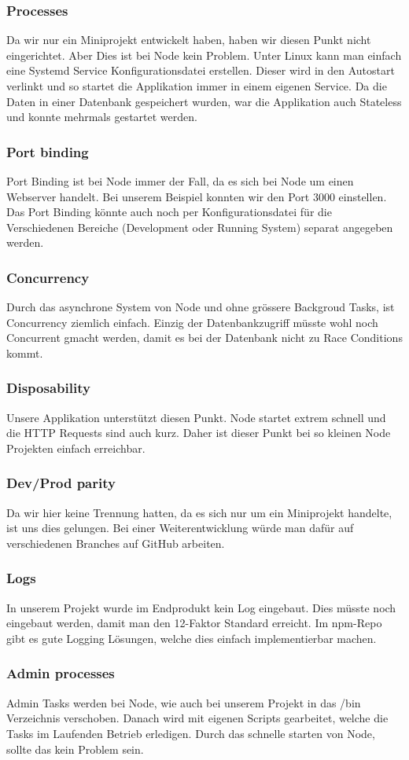 \subsubsection{Processes}
Da wir nur ein Miniprojekt entwickelt haben, haben wir diesen Punkt nicht eingerichtet. Aber Dies ist bei Node kein Problem. Unter Linux kann man einfach eine Systemd Service Konfigurationsdatei erstellen. Dieser wird in den Autostart verlinkt und so startet die Applikation immer in einem eigenen Service. Da die Daten in einer Datenbank gespeichert wurden, war die Applikation auch Stateless und konnte mehrmals gestartet werden.
\subsubsection{Port binding}
Port Binding ist bei Node immer der Fall, da es sich bei Node um einen Webserver handelt. Bei unserem Beispiel konnten wir den Port 3000 einstellen. Das Port Binding könnte auch noch per Konfigurationsdatei für die Verschiedenen Bereiche (Development oder Running System) separat angegeben werden.
\subsubsection{Concurrency}
Durch das asynchrone System von Node und ohne grössere Backgroud Tasks, ist Concurrency ziemlich einfach. Einzig der Datenbankzugriff müsste wohl noch Concurrent gmacht werden, damit es bei der Datenbank nicht zu Race Conditions kommt.
\subsubsection{Disposability}
Unsere Applikation unterstützt diesen Punkt. Node startet extrem schnell und die HTTP Requests sind auch kurz. Daher ist dieser Punkt bei so kleinen Node Projekten einfach erreichbar.
\subsubsection{Dev/Prod parity}
Da wir hier keine Trennung hatten, da es sich nur um ein Miniprojekt handelte, ist uns dies gelungen. Bei einer Weiterentwicklung würde man dafür auf verschiedenen Branches auf GitHub arbeiten.
\subsubsection{Logs}
In unserem Projekt wurde im Endprodukt kein Log eingebaut. Dies müsste noch eingebaut werden, damit man den 12-Faktor Standard erreicht. Im npm-Repo gibt es gute Logging Lösungen, welche dies einfach implementierbar machen.
\subsubsection{Admin processes}
Admin Tasks werden bei Node, wie auch bei unserem Projekt in das /bin Verzeichnis verschoben. Danach wird mit eigenen Scripts gearbeitet, welche die Tasks im Laufenden Betrieb erledigen. Durch das schnelle starten von Node, sollte das kein Problem sein.










